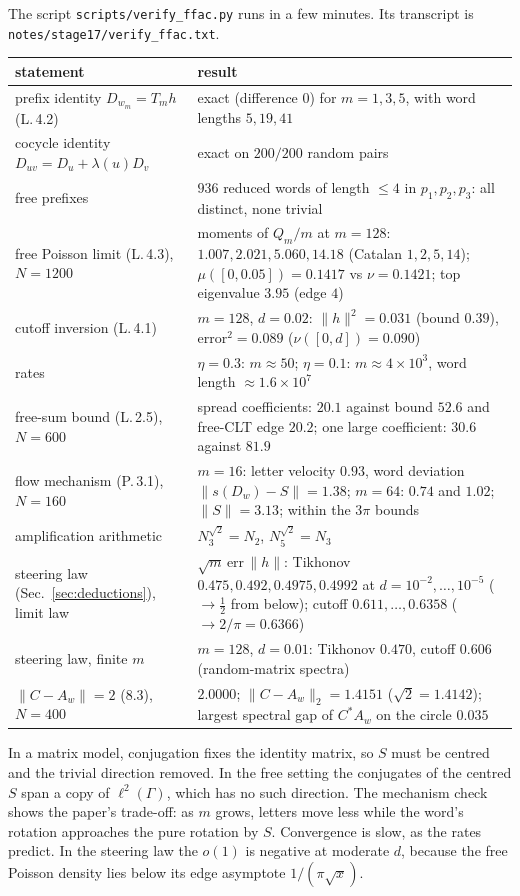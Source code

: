 \label{sec:checks}
The script \texttt{scripts/\allowbreak verify\_\allowbreak ffac.py} runs in a few minutes. Its transcript is
\texttt{notes/\allowbreak stage17/\allowbreak verify\_\allowbreak ffac.txt}.
\begin{center}\small
\begin{tabular}{>{\raggedright\arraybackslash}p{5.0cm}>{\raggedright\arraybackslash}p{9.0cm}}\toprule
statement & result\\\midrule
prefix identity $D_{w_m}=T_mh$ (L.\,4.2) & exact (difference $0$) for $m=1,3,5$, with word lengths $5,19,41$\\
cocycle identity $D_{uv}=D_u+\lambda(u)D_v$ & exact on $200/200$ random pairs\\
free prefixes & $936$ reduced words of length $\le4$ in $p_1,p_2,p_3$: all distinct, none trivial\\
free Poisson limit (L.\,4.3), $N=1200$ & moments of $Q_m/m$ at $m=128$: $1.007,2.021,5.060,14.18$ (Catalan $1,2,5,14$); $\mu([0,0.05])=0.1417$ vs $\nu=0.1421$; top eigenvalue $3.95$ (edge $4$)\\
cutoff inversion (L.\,4.1) & $m=128$, $d=0.02$: $\|h\|^2=0.031$ (bound $0.39$), error$^2=0.089$ ($\nu([0,d])=0.090$)\\
rates & $\eta=0.3$: $m\approx50$; $\eta=0.1$: $m\approx4\times10^3$, word length $\approx1.6\times10^7$\\
free-sum bound (L.\,2.5), $N=600$ & spread coefficients: $20.1$ against bound $52.6$ and free-CLT edge $20.2$; one large coefficient: $30.6$ against $81.9$\\
flow mechanism (P.\,3.1), $N=160$ & $m=16$: letter velocity $0.93$, word deviation $\|s(D_w)-S\|=1.38$; $m=64$: $0.74$ and $1.02$; $\|S\|=3.13$; within the $3\pi$ bounds\\
amplification arithmetic & $N_3^{\sqrt2}=N_2$, $N_5^{\sqrt2}=N_3$\\
steering law (Sec.~\ref{sec:deductions}), limit law & $\sqrt m\,\mathrm{err}\,\|h\|$: Tikhonov $0.475,0.492,0.4975,0.4992$ at $d=10^{-2},\dots,10^{-5}$ ($\to\frac12$ from below); cutoff $0.611,\dots,0.6358$ ($\to2/\pi=0.6366$)\\
steering law, finite $m$ & $m=128$, $d=0.01$: Tikhonov $0.470$, cutoff $0.606$ (random-matrix spectra)\\
$\|C-A_w\|=2$ (8.3), $N=400$ & $2.0000$; $\|C-A_w\|_2=1.4151$ ($\sqrt2=1.4142$); largest spectral gap of $C^*A_w$ on the circle $0.035$\\\bottomrule
\end{tabular}
\end{center}
In a matrix model, conjugation fixes the identity matrix, so $S$ must be centred and the trivial direction removed. In the free setting the
conjugates of the centred $S$ span a copy of $\ell^2(\Gamma)$, which has no such direction. The mechanism check shows the paper's trade-off: as $m$
grows, letters move less while the word's rotation approaches the pure rotation by $S$. Convergence is slow, as the rates predict. In the steering law the $o(1)$ is negative at moderate $d$, because the free
Poisson density lies below its edge asymptote $1/(\pi\sqrt x)$.
